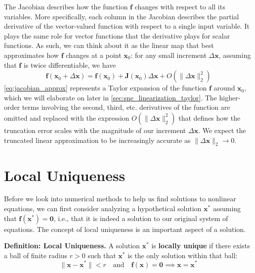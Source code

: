 The Jacobian describes how the function $\mathbf{f}$ changes with respect to all its variables. More specifically, each column in the Jacobian describes the partial derivative of the vector-valued function with respect to a single input variable. It plays the same role for vector functions that the derivative plays for scalar functions. As such, we can think about it as the linear map that best approximates how $\mathbf f$ changes at a point $\mathbf x_0$: for any small increment $\Delta \mathbf x$, assuming that $\mathbf f$ is twice differentiable, we have
\begin{equation}
\label{eq:jacobian_approx}
\mathbf f(\mathbf x_0 + \Delta \mathbf x) = \mathbf f(\mathbf x_0) + \mathbf{J}(\mathbf x_0) \Delta \mathbf x  + O(\|\Delta \mathbf x\|_2^2)
\end{equation}
\autoref{eq:jacobian_approx} represents a Taylor expansion of the function $\mathbf f$ around $\mathbf x_0$, which we will elaborate on later in \autoref{sec:sne_linearization_taylor}. The higher-order terms involving the second, third, etc. derivatives of the function are omitted and replaced with the expression $O(\|\Delta \mathbf x\|_2^2)$ that defines how the truncation error scales with the magnitude of our increment $\Delta \mathbf x$. We expect the truncated linear approximation to be increasingly accurate as $\|\Delta \mathbf x\|_2 \to 0$. 

\section{Local Uniqueness}

Before we look into numerical methods to help us find solutions to nonlinear equations, we can first consider analyzing a hypothetical solution $\mathbf{x^*}$ assuming that $\mathbf{f(x^*)=0}$, i.e., that it is indeed a solution to our original system of equations. The concept of local uniqueness is an important aspect of a solution.

\begin{definitionBox}
\textbf{Definition: Local Uniqueness.}
A solution $\mathbf{x}^*$ is \textbf{locally unique} if there exists a ball of finite radius $r > 0$ such that $\mathbf{x}^*$ is the only solution within that ball:
\begin{equation}
\|\mathbf{x} - \mathbf{x}^*\| < r \quad \text{and} \quad \mathbf{f}(\mathbf{x}) = \mathbf{0} \implies \mathbf{x} = \mathbf{x}^*
\end{equation}
\end{definitionBox}  



